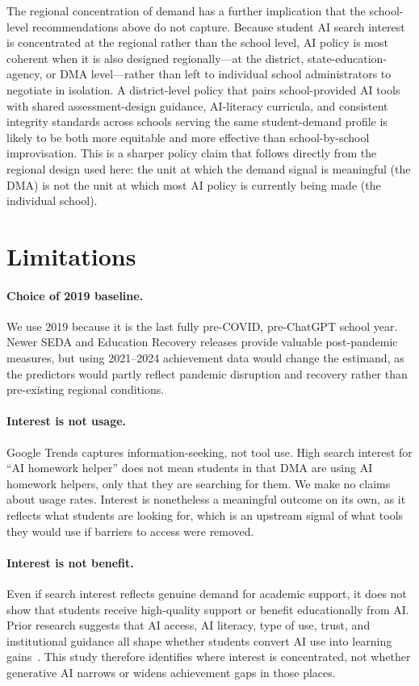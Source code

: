 \documentclass[11pt]{article}
\begin{document}
The regional concentration of demand has a further implication that the school-level recommendations above do not capture. Because student AI search interest is concentrated at the regional rather than the school level, AI policy is most coherent when it is also designed regionally---at the district, state-education-agency, or DMA level---rather than left to individual school administrators to negotiate in isolation. A district-level policy that pairs school-provided AI tools with shared assessment-design guidance, AI-literacy curricula, and consistent integrity standards across schools serving the same student-demand profile is likely to be both more equitable and more effective than school-by-school improvisation. This is a sharper policy claim that follows directly from the regional design used here: the unit at which the demand signal is meaningful (the DMA) is not the unit at which most AI policy is currently being made (the individual school).

\section{Limitations}

\paragraph{Choice of 2019 baseline.} We use 2019 because it is the last fully pre-COVID, pre-ChatGPT school year. Newer SEDA and Education Recovery releases provide valuable post-pandemic measures, but using 2021--2024 achievement data would change the estimand, as the predictors would partly reflect pandemic disruption and recovery rather than pre-existing regional conditions.

\paragraph{Interest is not usage.} Google Trends captures information-seeking, not tool use. High search interest for ``AI homework helper'' does not mean students in that DMA are using AI homework helpers, only that they are searching for them. We make no claims about usage rates. Interest is nonetheless a meaningful outcome on its own, as it reflects what students are looking for, which is an upstream signal of what tools they would use if barriers to access were removed.

\paragraph{Interest is not benefit.} Even if search interest reflects genuine demand for academic support, it does not show that students receive high-quality support or benefit educationally from AI. Prior research suggests that AI access, AI literacy, type of use, trust, and institutional guidance all shape whether students convert AI use into learning gains~\citep{zhang2025, zhang2026, beckman2025, yu2024}. This study therefore identifies where interest is concentrated, not whether generative AI narrows or widens achievement gaps in those places.
\end{document}
